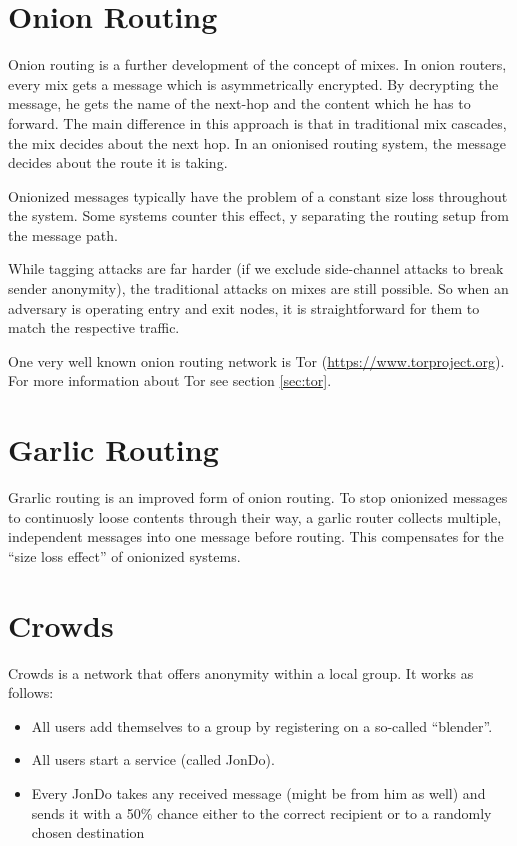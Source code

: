 \section{Onion Routing}
Onion routing is a further development of the concept of mixes. In onion routers, every mix gets a message which is asymmetrically encrypted. By decrypting the message, he gets the name of the next-hop and the content which he has to forward. The main difference in this approach is that in traditional mix cascades, the mix decides about the next hop. In an onionised routing system, the message decides about the route it is taking. 

Onionized messages typically have the problem of a constant size loss throughout the system. Some systems counter this effect, y separating the routing setup from the message path.

While tagging attacks are far harder (if we exclude side-channel attacks to break sender anonymity), the traditional attacks on mixes are still possible. So when an adversary is operating entry and exit nodes, it is straightforward for them to match the respective traffic.

One very well known onion routing network is Tor (\href{https://www.torproject.org}{https://www.torproject.org}). For more information about Tor see section \ref{sec:tor}.

\section{Garlic Routing}
Grarlic routing is an improved form of onion routing. To stop onionized messages to continuosly loose contents through their way, a garlic router collects multiple, independent messages into one message before routing. This compensates for the ``size loss effect'' of onionized systems.

\section{Crowds}
Crowds is a network that offers anonymity within a local group. It works as follows:

\begin{itemize}
	\item All users add themselves to a group by registering on a so-called ``blender''.
	\item All users start a service (called JonDo).
	\item Every JonDo takes any received message (might be from him as well) and sends it with a 50\% chance either to the correct recipient or to a randomly chosen destination
\end{itemize}

